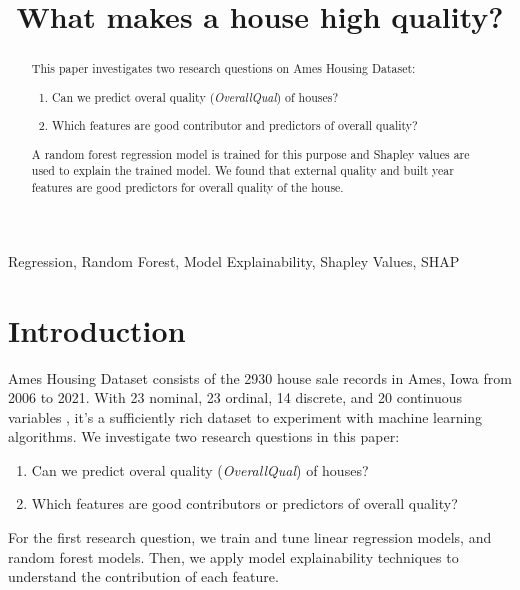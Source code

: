 \documentclass[conference]{IEEEtran}
\begin{document}

\title{What makes a house high quality?\\ }

\author{
}


\maketitle

\begin{abstract}
This paper investigates two research questions on Ames Housing Dataset:
\begin{enumerate}
    \item Can we predict overal quality (\textit{OverallQual}) of houses?
    \item Which features are good contributor and predictors of overall quality? 
\end{enumerate}
A random forest regression model is trained for this purpose and Shapley values
are used to explain the trained model. We found that external quality and built year features are
good predictors for overall quality of the house.
\end{abstract}

\begin{IEEEkeywords}
Regression, Random Forest, Model Explainability, Shapley Values, SHAP
\end{IEEEkeywords}

\section{Introduction}

Ames Housing Dataset \cite{DeCock2011} consists of the 2930 house sale records in Ames, Iowa from 2006 to 2021.
With 23 nominal, 23 ordinal, 14 discrete, and 20 continuous variables \cite{DeCock2011}, 
it's a sufficiently rich dataset to experiment with machine learning algorithms.
We investigate two research questions in this paper:
\begin{enumerate}
\item Can we predict overal quality (\textit{OverallQual}) of houses?
\item Which features are good contributors or predictors of overall quality? 
\end{enumerate}
For the first research question, we train and tune linear regression models, and random forest models.
Then, we apply model explainability techniques to understand the contribution of each feature.
\end{document}
